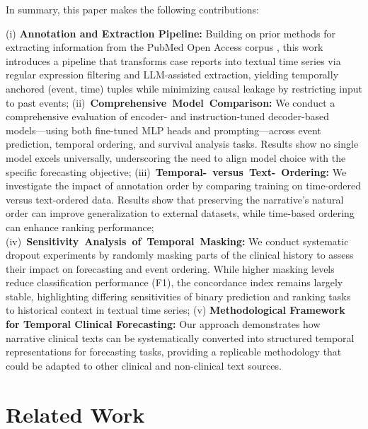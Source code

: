 \documentclass[letterpaper]{article} %
\begin{document}
In summary, this paper makes the following contributions:

(i) \textbf{Annotation and Extraction Pipeline:} Building on prior methods for extracting information from the PubMed Open Access corpus \cite{noroozizadeh2025reconstructing}, this work introduces a pipeline that transforms case reports into textual time series via regular expression filtering and LLM-assisted extraction, yielding temporally anchored (event, time) tuples while minimizing causal leakage by restricting input to past events;
\mbox{(ii) \textbf{Comprehensive Model Comparison:}} 
    We conduct a comprehensive evaluation of encoder- and instruction-tuned decoder-based models—using both fine-tuned MLP heads and prompting—across event prediction, temporal ordering, and survival analysis tasks. Results show no single model excels universally, underscoring the need to align model choice with the specific forecasting objective;
\mbox{(iii) \textbf{Temporal- versus Text- Ordering:}}
    We investigate the impact of annotation order by comparing training on time-ordered versus text-ordered data. Results show that preserving the narrative's natural order can improve generalization to external datasets, while time-based ordering can enhance ranking performance;
\mbox{(iv) \textbf{Sensitivity Analysis of Temporal Masking:}}
    We conduct systematic dropout experiments by randomly masking parts of the clinical history to assess their impact on forecasting and event ordering. While higher masking levels reduce classification performance (F1), the concordance index remains largely stable, highlighting differing sensitivities of binary prediction and ranking tasks to historical context in textual time series;
(v) \textbf{Methodological Framework for Temporal Clinical Forecasting:} Our approach demonstrates how narrative clinical texts can be systematically converted into structured temporal representations for forecasting tasks, providing a replicable methodology that could be adapted to other clinical and non-clinical text sources. 


\section{Related Work}
\end{document}
